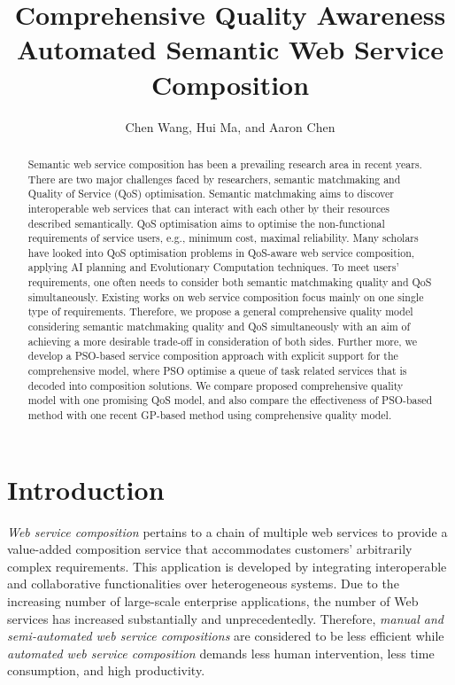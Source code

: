 \documentclass{llncs}
\title{Comprehensive Quality Awareness Automated Semantic Web Service Composition}
\author{Chen Wang, Hui Ma, and Aaron Chen}
\institute{School of Engineering and Computer Science,
\\Victoria University of Wellington, New Zealand \\
Email: \{chen.wang, hui.ma, aaron.chen\}@ecs.vuw.ac.nz}
\begin{document}
\maketitle
\begin{abstract}
Semantic web service composition has been a prevailing research area in recent years. There are two major challenges faced by researchers, semantic matchmaking and Quality of Service (QoS) optimisation. Semantic matchmaking aims to discover interoperable web services that can interact with each other by their resources described semantically. QoS optimisation aims to optimise the non-functional requirements of service users, e.g., minimum cost, maximal reliability. Many scholars have looked into QoS optimisation problems in QoS-aware web service composition, applying AI planning and Evolutionary Computation techniques. To meet users' requirements, one often needs to consider both semantic matchmaking quality and QoS simultaneously. Existing works on web service composition focus mainly on one single type of requirements. Therefore, we propose a general comprehensive quality model considering semantic matchmaking quality and QoS simultaneously with an aim of achieving a more desirable trade-off in consideration of both sides. Further more, we develop a PSO-based service composition approach with explicit support for the comprehensive model, where PSO optimise a queue of task related services that is decoded into composition solutions. We compare proposed comprehensive quality model with one promising QoS model, and also compare the effectiveness of PSO-based method with one recent GP-based method using comprehensive quality model.

\end{abstract}
\section{Introduction}\label{introduction}

\textit{Web service composition} pertains to a chain of multiple web services to provide a value-added composition service that accommodates customers' arbitrarily complex requirements. This application is developed by integrating interoperable and collaborative functionalities over heterogeneous systems. Due to the increasing number of large-scale enterprise applications, the number of Web services has increased substantially and unprecedentedly. Therefore, \textit{manual and semi-automated web service compositions} are considered to be less efficient while \textit{automated web service composition} demands less human intervention, less time consumption, and high productivity.
\end{document}
